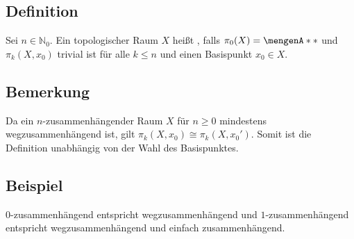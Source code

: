 \subsection[Definition: $n$-zusammenhängender Raum]{Definition} %
\label{sub:1516}
Sei $n \in \mathds{N}_0$. Ein topologischer Raum $X$ heißt , falls $\pi_0(X)=\set{*}$ und
$\pi_k(X,x_0)$ trivial ist für alle $k \le n$ und einen Basispunkt $x_0 \in X$.

\subsection[Bemerkung: Abhängigkeit von der Wahl eines Basispunktes]{Bemerkung} %
\label{sub:1517}
Da ein $n$-zusammenhängender Raum $X$ für $n \ge 0$ mindestens wegzusammenhängend ist, gilt $\pi_k(X,x_0) \cong \pi_k(X,x_0')$. Somit ist die Definition unabhängig von der 
Wahl des Basispunktes.

\subsection[Beispiele: $0$-zusammenhängend und $1$-zusammenhängend]{Beispiel} %
\label{sub:1518}
$0$-zusammenhängend entspricht wegzusammenhängend und $1$-zusammenhängend entspricht wegzusammenhängend und einfach zusammenhängend.

